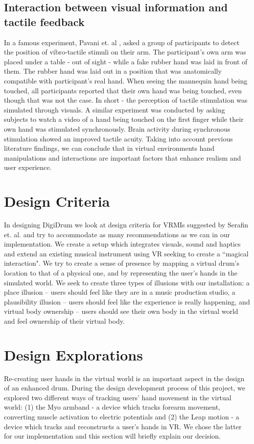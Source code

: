 \documentclass{article}
\begin{document}
\subsection{Interaction between visual information and tactile feedback}
In a famous experiment, Pavani et. al \cite{Pavani2000},  asked a group of participants to detect the position of vibro-tactile stimuli on their arm. The participant's own arm was placed under a table - out of sight - while a fake rubber hand was laid in front of them. The rubber hand was laid out in a position that was anatomically compatible with participant's real hand. When seeing the mannequin hand being touched, all participants reported that their own hand was being touched, even though that was not the case. In short - the perception of tactile stimulation was simulated through visuals. A similar experiment was conducted by \cite{Schaefer2006} asking subjects to watch a video of a hand being touched on the first finger while their own hand was stimulated synchronously. Brain activity during synchronous stimulation showed an improved tactile acuity. Taking into account previous literature findings, we can conclude that in virtual environments hand manipulations and interactions are important factors that enhance realism and user experience. 


\section{Design Criteria}\label{sec:Design_criteria}

In designing DigiDrum we look at design criteria for VRMIs suggested by Serafin et. al. \cite{Serafin:2016} and try to accommodate as many recommendations as we can in our implementation. We create a setup which integrates visuals, sound and haptics and extend an existing musical instrument using VR seeking to create a ``magical interaction". We try to create a sense of presence by mapping a virtual drum's location to that of a physical one, and by representing the user's hands in the simulated world. We seek to create three types of illusions with our installation: a place illusion -- users should feel like they are in a music production studio, a plausibility illusion -- users should feel like the experience is really happening, and virtual body ownership -- users should see their own body in the virtual world and feel ownership of their virtual body.

\section{Design Explorations}\label{sec:desex}
Re-creating user hands in the virtual world is an important aspect in the design of an enhanced drum. During the design development process of this project, we explored two different ways of tracking users' hand movement in the virtual world: (1) the Myo armband - a device which tracks forearm movement, converting muscle activation to electric potentials and (2) the Leap motion - a device which tracks and reconstructs a user's hands in VR. We chose the latter for our implementation and this section will briefly explain our decision. 
\end{document}
